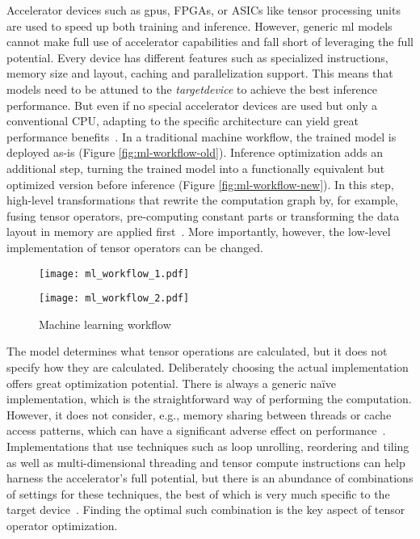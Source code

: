 Accelerator devices such as \glspl{gpu}, FPGAs, or ASICs like tensor processing units are used to speed up both training and inference. However, generic \gls{ml} models cannot make full use of accelerator capabilities and fall short of leveraging the full potential. Every device has different features such as specialized instructions, memory size and layout, caching and parallelization support. This means that models need to be attuned to the \textit{\gls{targetdevice}} to achieve the best inference performance. But even if no special accelerator devices are used but only a conventional CPU, adapting to the specific architecture can yield great performance benefits~\cite[p.~1]{Liu.2019}. In a traditional machine workflow, the trained model is deployed as-is (Figure \ref{fig:ml-workflow-old}). Inference optimization adds an additional step, turning the trained model into a functionally equivalent but optimized version before inference (Figure \ref{fig:ml-workflow-new}). In this step, high-level transformations that rewrite the computation graph by, for example, fusing tensor operators, pre-computing constant parts or transforming the data layout in memory are applied first~\cites[p.~1--3]{Chen.2018b}. More importantly, however, the low-level implementation of tensor operators can be changed.

\begin{figure}
	\begin{minipage}[b]{.5\textwidth}
		\centering\texttt{[image: ml\_workflow\_1.pdf]}
		\label{fig:ml-workflow-old}
	\end{minipage}%
	\begin{minipage}[b]{.5\textwidth}
		\centering\texttt{[image: ml\_workflow\_2.pdf]}
		\label{fig:ml-workflow-new}
	\end{minipage}
	\caption[Traditional vs. optimized machine learning workflow]{Machine learning workflow}
	\label{fig:ml-workflow}
\end{figure}

The model determines what tensor operations are calculated, but it does not specify how they are calculated. Deliberately choosing the actual implementation offers great optimization potential. There is always a generic naïve implementation, which is the straightforward way of performing the computation. However, it does not consider, e.g., memory sharing between threads or cache access patterns, which can have a significant adverse effect on performance~\cite{Hu.2017}. Implementations that use techniques such as loop unrolling, reordering and tiling as well as multi-dimensional threading and tensor compute instructions can help harness the accelerator's full potential, but there is an abundance of combinations of settings for these techniques, the best of which is very much specific to the target device~\cite[p.~2]{Chen.2018b}. Finding the optimal such combination is the key aspect of tensor operator optimization.

